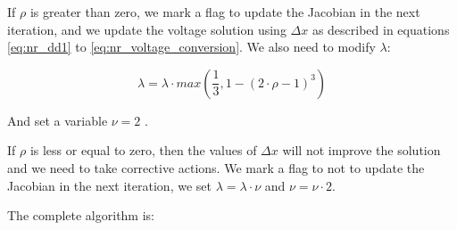 \documentclass[a4paper,twoside,fleqn]{tufte-book}
\begin{document}
If $\rho$ is greater than zero, we mark a flag to update the Jacobian in the next iteration, and we update the voltage solution using $\Delta x$ as described in equations  \ref{eq:nr_dd1} to \ref{eq:nr_voltage_conversion}. We also need to modify $\lambda$:


\begin{equation}
\lambda = \lambda \cdot max(\frac{1}{3}, 1-(2\cdot \rho -1)^3)
\label{eq:lm_update_l}
\end{equation}

And set a variable $\nu=2$ .


If $\rho$ is less or equal to zero, then the values of $\Delta x$ will not improve the solution and we need to take corrective actions. We mark a flag to not to update the Jacobian in the next iteration, we set $\lambda=\lambda \cdot \nu$ and $\nu = \nu \cdot 2$.


The complete algorithm is: 
\end{document}
